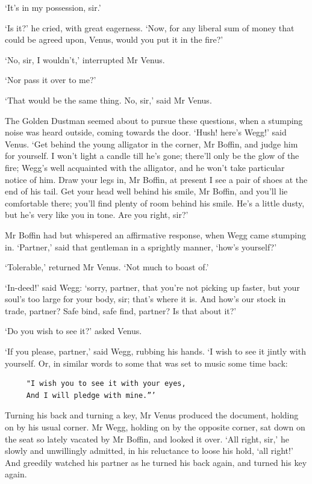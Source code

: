 ‘It’s in my possession, sir.’

‘Is it?’ he cried, with great eagerness. ‘Now, for any liberal sum of
money that could be agreed upon, Venus, would you put it in the fire?’

‘No, sir, I wouldn’t,’ interrupted Mr Venus.

‘Nor pass it over to me?’

‘That would be the same thing. No, sir,’ said Mr Venus.

The Golden Dustman seemed about to pursue these questions, when a
stumping noise was heard outside, coming towards the door. ‘Hush! here’s
Wegg!’ said Venus. ‘Get behind the young alligator in the corner, Mr
Boffin, and judge him for yourself. I won’t light a candle till he’s
gone; there’ll only be the glow of the fire; Wegg’s well acquainted with
the alligator, and he won’t take particular notice of him. Draw your
legs in, Mr Boffin, at present I see a pair of shoes at the end of his
tail. Get your head well behind his smile, Mr Boffin, and you’ll lie
comfortable there; you’ll find plenty of room behind his smile. He’s a
little dusty, but he’s very like you in tone. Are you right, sir?’

Mr Boffin had but whispered an affirmative response, when Wegg came
stumping in. ‘Partner,’ said that gentleman in a sprightly manner,
‘how’s yourself?’

‘Tolerable,’ returned Mr Venus. ‘Not much to boast of.’

‘In-deed!’ said Wegg: ‘sorry, partner, that you’re not picking up
faster, but your soul’s too large for your body, sir; that’s where
it is. And how’s our stock in trade, partner? Safe bind, safe find,
partner? Is that about it?’

‘Do you wish to see it?’ asked Venus.

‘If you please, partner,’ said Wegg, rubbing his hands. ‘I wish to see
it jintly with yourself. Or, in similar words to some that was set to
music some time back:

\begin{verbatim}
     "I wish you to see it with your eyes,
     And I will pledge with mine.”’
\end{verbatim}

Turning his back and turning a key, Mr Venus produced the document,
holding on by his usual corner. Mr Wegg, holding on by the opposite
corner, sat down on the seat so lately vacated by Mr Boffin, and looked
it over. ‘All right, sir,’ he slowly and unwillingly admitted, in his
reluctance to loose his hold, ‘all right!’ And greedily watched his
partner as he turned his back again, and turned his key again.

